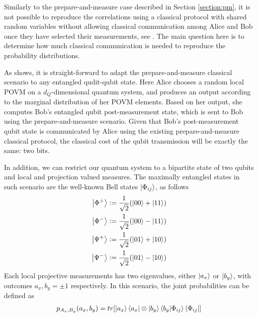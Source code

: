 Similarly to the prepare-and-measure case described in Section \ref{section:pm}, it is not possible to reproduce the correlations using a classical protocol with shared random variables without allowing classical communication among Alice and Bob once they have selected their measurements, see \cite{bell1964}. The main question here is to determine how much classical communication is needed to reproduce the probability distributions.

As \cite{renner2022} shows, it is straight-forward to adapt the prepare-and-measure classical scenario to any entangled qudit-qubit state. Here Alice chooses a random local POVM on a $d_Q$-dimensional quantum system, and produces an output according to the marginal distribution of her POVM elements. Based on her output, she computes Bob's entangled qubit post-measurement state, which is sent to Bob using the prepare-and-measure scenario. Given that Bob's post-measurement qubit state is communicated by Alice using the existing prepare-and-measure classical protocol, the classical cost of the qubit transmission will be exactly the same: two bits. 

In addition, we can restrict our quantum system to a bipartite state of two qubits and local and projection valued measures. The maximally entangled states in such scenario are the well-known Bell states $\ket{\Phi_{ij}}$, as follows
\begin{equation}\label{eq:bell_states}
\begin{split}
\ket{\Phi^{+}} \vcentcolon= \frac{1}{\sqrt{2}}(\ket{00} + \ket{11})\\
\ket{\Phi^{-}} \vcentcolon= \frac{1}{\sqrt{2}}(\ket{00} - \ket{11})\\
\ket{\Psi^{+}} \vcentcolon= \frac{1}{\sqrt{2}}(\ket{01} + \ket{10})\\
\ket{\Psi^{-}} \vcentcolon= \frac{1}{\sqrt{2}}(\ket{01} - \ket{10})
\end{split}
\end{equation}
Each local projective measurements has two eigenvalues, either $\ket{a_{x}}$ or $\ket{b_{y}}$, with outcomes $a_{x}, b_{y}=\pm1$ respectively. In this scenario, the joint probabilities can be defined as
\begin{equation}\label{eq:prob_quantum_bell}
\begin{split}
p_{A_x,B_y}(a_x, b_y) = tr[\ket{a_{x}}\bra{a_{x}} \otimes \ket{b_{y}}\bra{b_{y}} \ket{\Phi_{ij}} \bra{\Phi_{ij}}]\\
\end{split}
\end{equation}

